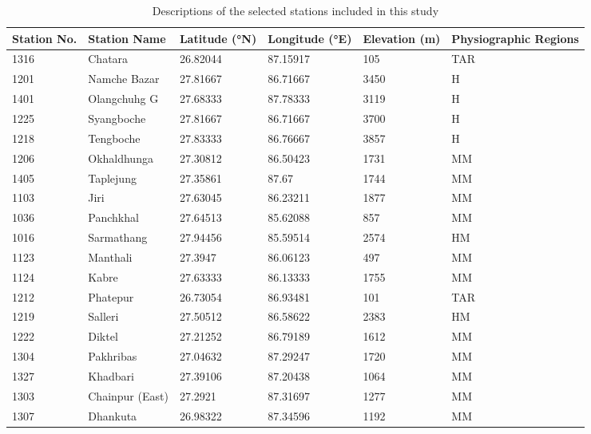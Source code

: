 \begin{table}[H]
  \centering
  \caption{Descriptions of the selected stations included in this study}
  \label{tab:station_descriptions}
  \begin{tabularx}{\textwidth}{|X|X|X|X|X|X|}
      \toprule %
      \textbf{Station No.} & \textbf{Station Name} & \textbf{Latitude (°N)} & \textbf{Longitude (°E)} & \textbf{Elevation (m)} & \textbf{Physiographic Regions} \\
      \midrule %
      1316 & Chatara           & 26.82044 & 87.15917 & 105  & TAR \\
      1201 & Namche Bazar      & 27.81667 & 86.71667 & 3450 & H \\
      1401 & Olangchuhg G      & 27.68333 & 87.78333 & 3119 & H \\
      1225 & Syangboche        & 27.81667 & 86.71667 & 3700 & H \\
      1218 & Tengboche         & 27.83333 & 86.76667 & 3857 & H \\
      1206 & Okhaldhunga       & 27.30812 & 86.50423 & 1731 & MM \\
      1405 & Taplejung         & 27.35861 & 87.67    & 1744 & MM \\
      1103 & Jiri              & 27.63045 & 86.23211 & 1877 & MM \\
      1036 & Panchkhal         & 27.64513 & 85.62088 & 857  & MM \\
      1016 & Sarmathang        & 27.94456 & 85.59514 & 2574 & HM \\
      1123 & Manthali          & 27.3947  & 86.06123 & 497  & MM \\
      1124 & Kabre             & 27.63333 & 86.13333 & 1755 & MM \\
      1212 & Phatepur          & 26.73054 & 86.93481 & 101  & TAR \\
      1219 & Salleri           & 27.50512 & 86.58622 & 2383 & HM \\
      1222 & Diktel            & 27.21252 & 86.79189 & 1612 & MM \\
      1304 & Pakhribas         & 27.04632 & 87.29247 & 1720 & MM \\
      1327 & Khadbari          & 27.39106 & 87.20438 & 1064 & MM \\
      1303 & Chainpur (East)   & 27.2921  & 87.31697 & 1277 & MM \\
      1307 & Dhankuta          & 26.98322 & 87.34596 & 1192 & MM \\

\end{tabularx}
\end{table}
